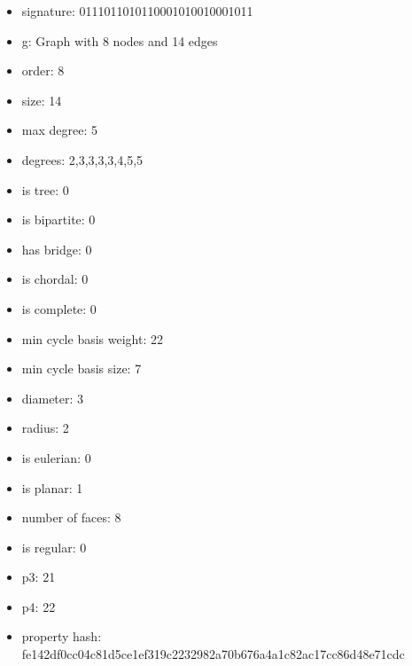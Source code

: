 \begin{itemize}
\item signature: 0111011010110001010010001011
\item g: Graph with 8 nodes and 14 edges
\item order: 8
\item size: 14
\item max degree: 5
\item degrees: 2,3,3,3,3,4,5,5
\item is tree: 0
\item is bipartite: 0
\item has bridge: 0
\item is chordal: 0
\item is complete: 0
\item min cycle basis weight: 22
\item min cycle basis size: 7
\item diameter: 3
\item radius: 2
\item is eulerian: 0
\item is planar: 1
\item number of faces: 8
\item is regular: 0
\item p3: 21
\item p4: 22
\item property hash: fe142df0cc04c81d5ce1ef319c2232982a70b676a4a1c82ac17cc86d48e71cdc
\end{itemize}
\newpage
\begin{figure}
\end{figure}
